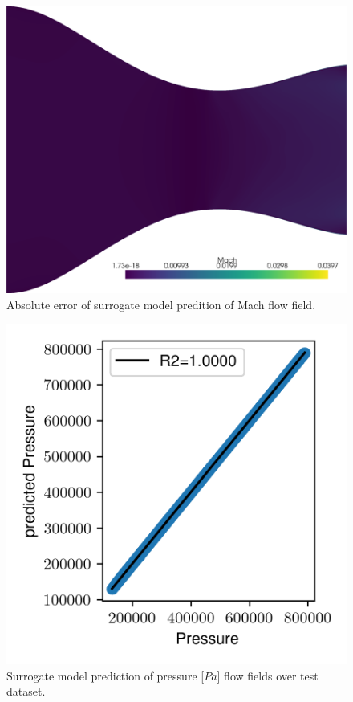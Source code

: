 \documentclass[10pt,oneside,a4paper,twocolumn]{article}
\begin{document}
\begin{figure}[htbp]
  \centering
  \includegraphics[width=0.8\columnwidth]{figures/Mach_field_error.png}
  \caption{Absolute error of surrogate model predition of Mach flow field.}
  \label{fig:error_mach}
\end{figure}


\begin{figure}[htbp]
  \centering
  \includegraphics[width=\columnwidth]{figures/results/Pressure.png}
  \caption{Surrogate model prediction of pressure [$Pa$] flow fields over test dataset.}
  \label{fig:r2_pressure}
\end{figure}
\end{document}
